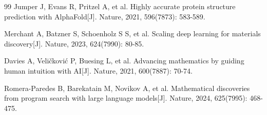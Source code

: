 \begin{thebibliography}{99}
 Jumper J, Evans R, Pritzel A, et al. Highly accurate protein structure prediction with AlphaFold[J]. Nature, 2021, 596(7873): 583-589.

 Merchant A, Batzner S, Schoenholz S S, et al. Scaling deep learning for materials discovery[J]. Nature, 2023, 624(7990): 80-85.

 Davies A, Veličković P, Buesing L, et al. Advancing mathematics by guiding human intuition with AI[J]. Nature, 2021, 600(7887): 70-74.

 Romera-Paredes B, Barekatain M, Novikov A, et al. Mathematical discoveries from program search with large language models[J]. Nature, 2024, 625(7995): 468-475.

\end{thebibliography}
